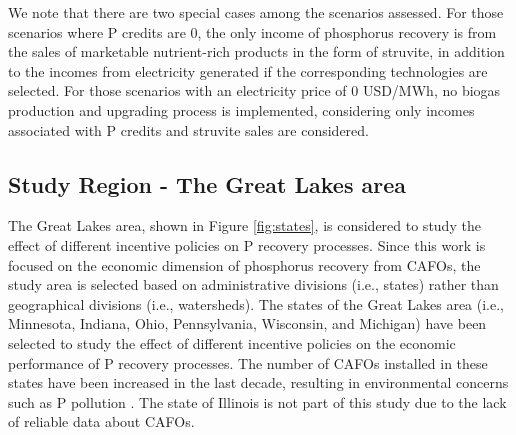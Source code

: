 \begin{refsection}[referencesCh5]
We note that there are two special cases among the scenarios assessed. For those scenarios where P credits are 0, the only income of phosphorus recovery is from the sales of marketable nutrient-rich products in the form of struvite, in addition to the incomes from electricity generated if the corresponding technologies are selected. For those scenarios with an electricity price of 0 USD/MWh, no biogas production and upgrading process is implemented, considering only incomes associated with P credits and struvite sales are considered.

\subsection{Study Region - The Great Lakes area}

The Great Lakes area, shown in Figure \ref{fig:states}, is considered to study the effect of different incentive policies on P recovery processes.
Since this work is focused on the economic dimension of phosphorus recovery from CAFOs, the study area is selected based on administrative divisions (i.e., states) rather than geographical divisions (i.e., watersheds). The states of the Great Lakes area (i.e., Minnesota, Indiana, Ohio, Pennsylvania, Wisconsin, and Michigan) have been selected to study the effect of different incentive policies on the economic performance of P recovery processes. The number of CAFOs installed in these states have been increased in the last decade, resulting in environmental concerns such as P pollution \citep{NPDE_Implementation}. The state
of Illinois
is not part of this study due to the lack of reliable data about CAFOs.


\end{refsection}
